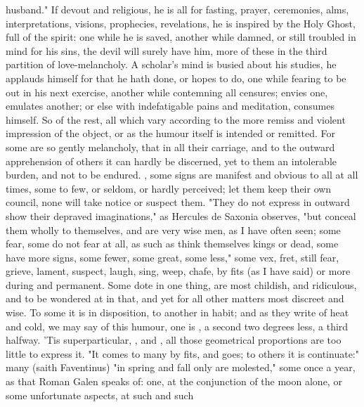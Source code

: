 {husband." If devout and religious, he is all for fasting, prayer, ceremonies,
alms, interpretations, visions, prophecies, revelations,
he is inspired by the Holy Ghost, full of the spirit: one
while he is saved, another while damned, or still troubled in mind for his
sins, the devil will surely have him, \etc{} more of these in the third
partition of love-melancholy. A scholar's mind is busied
about his studies, he applauds himself for that he hath done, or hopes to do,
one while fearing to be out in his next exercise, another while contemning all
censures; envies one, emulates another; or else with indefatigable pains and
meditation, consumes himself. So of the rest, all which vary according to the
more remiss and violent impression of the object, or as the humour itself is
intended or remitted. For some are so gently melancholy, that in all their
carriage, and to the outward apprehension of others it can hardly be discerned,
yet to them an intolerable burden, and not to be endured.
, some signs are
manifest and obvious to all at all times, some to few, or seldom, or hardly
perceived; let them keep their own council, none will take notice or suspect
them. "They do not express in outward show their depraved imaginations," as
Hercules de Saxonia observes, "but conceal them wholly to
themselves, and are very wise men, as I have often seen; some fear, some do not
fear at all, as such as think themselves kings or dead, some have more signs,
some fewer, some great, some less," some vex, fret, still fear, grieve, lament,
suspect, laugh, sing, weep, chafe, \etc{} by fits (as I have said) or more
during and permanent. Some dote in one thing, are most childish, and
ridiculous, and to be wondered at in that, and yet for all other matters most
discreet and wise. To some it is in disposition, to another in habit; and as
they write of heat and cold, we may say of this humour, one is
, a second two degrees less, a third halfway. 'Tis
superparticular, , and , \etc{} all those geometrical proportions are
too little to express it. "It comes to many by fits, and
goes; to others it is continuate:" many (saith Faventinus)
"in spring and fall only are molested," some once a year, as that Roman
Galen speaks of: one, at the
conjunction of the moon alone, or some unfortunate aspects, at such and such
}
